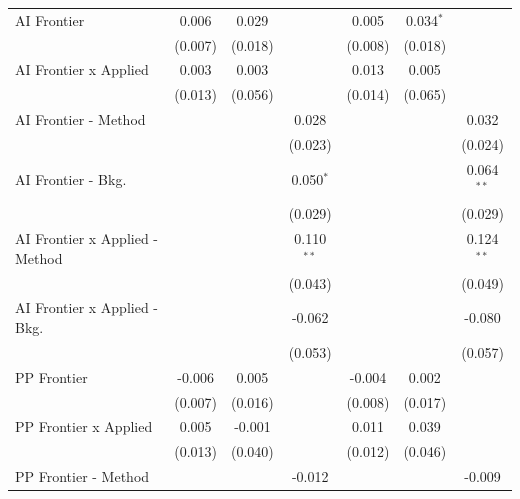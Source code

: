 \begin{tabular}{lcccccc}
   AI Frontier                    & 0.006        & 0.029   &              & 0.005         & 0.034$^{*}$ &   \\   
                                  & (0.007)      & (0.018) &              & (0.008)       & (0.018)     &   \\   
   AI Frontier x Applied          & 0.003        & 0.003   &              & 0.013         & 0.005       &   \\   
                                  & (0.013)      & (0.056) &              & (0.014)       & (0.065)     &   \\   
   AI Frontier - Method           &              &         & 0.028        &               &             & 0.032\\   
                                  &              &         & (0.023)      &               &             & (0.024)\\   
   AI Frontier - Bkg.             &              &         & 0.050$^{*}$  &               &             & 0.064$^{**}$\\   
                                  &              &         & (0.029)      &               &             & (0.029)\\   
   AI Frontier x Applied - Method &              &         & 0.110$^{**}$ &               &             & 0.124$^{**}$\\   
                                  &              &         & (0.043)      &               &             & (0.049)\\   
   AI Frontier x Applied - Bkg.   &              &         & -0.062       &               &             & -0.080\\   
                                  &              &         & (0.053)      &               &             & (0.057)\\   
   PP Frontier                    & -0.006       & 0.005   &              & -0.004        & 0.002       &   \\   
                                  & (0.007)      & (0.016) &              & (0.008)       & (0.017)     &   \\   
   PP Frontier x Applied          & 0.005        & -0.001  &              & 0.011         & 0.039       &   \\   
                                  & (0.013)      & (0.040) &              & (0.012)       & (0.046)     &   \\   
   PP Frontier - Method           &              &         & -0.012       &               &             & -0.009\\   

\end{tabular}
